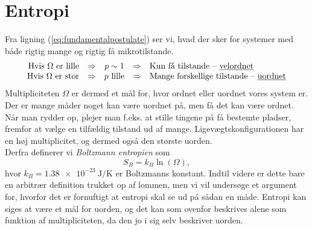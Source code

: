 \section{Entropi}
Fra ligning (\ref{eq:fundamentalpostulate}) ser vi, hvad der sker for systemer med både rigtig mange og rigtig få mikrotilstande.
\begin{equation*}
    \begin{array}{rcccl}
        \text{Hvis $\Omega$ er lille} & \Rightarrow & p\sim 1 & \Rightarrow & \text{Kun få tilstande -- \underline{velordnet}}\\
        \text{Hvis $\Omega$ er stor} & \Rightarrow & p\text{ lille} & \Rightarrow & \text{Mange forskellige tilstande -- \underline{uordnet}}
    \end{array}
\end{equation*}
Multipliciteten $\Omega$ er dermed et mål for, hvor ordnet eller uordnet vores system er. Der er mange måder noget kan være uordnet på, men få det kan være ordnet. Når man rydder op, plejer man f.eks. at stille tingene på få bestemte pladser, fremfor at vælge en tilfældig tilstand ud af mange. Ligevægtskonfigurationen har en høj multiplicitet, og dermed også den største uorden. \\
Derfra definerer vi \emph{Boltzmann entropien} som
\begin{equation}\label{eq:boltzmannentropi}
    S_B=k_B\ln{(\Omega)},
\end{equation}
hvor $k_B=\SI{1.38e-23}{\joule\per\kelvin}$ er Boltzmanns konstant. Indtil videre er dette bare en arbitrær definition trukket op af lommen, men vi vil undersøge et argument for, hvorfor det er fornuftigt at entropi skal se ud på sådan en måde. Entropi kan siges at være et mål for uorden, og det kan som ovenfor beskrives alene som funktion af multipliciteten, da den jo i sig selv beskriver uorden.
